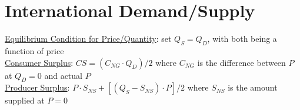 \documentclass{article}
\begin{document}
\newpage

\section{International Demand/Supply}
\underline{Equilibrium Condition for Price/Quantity}: set $Q_{S} = Q_{D}$, with both being a function of price \\
\underline{Consumer Surplus}: $CS = (C_{NG} \cdot Q_{D})/2$ where $C_{NG}$ is the difference between $P$ at $Q_{D} = 0$ and actual $P$ \\
\underline{Producer Surplus}: $P \cdot S_{NS} +  [(Q_{S} - S_{NS}) \cdot P]/2$ where $S_{NS}$ is the amount supplied at $P = 0$
\end{document}
